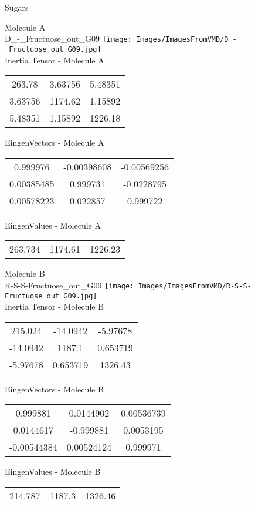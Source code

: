 \vtab[-2cm]
\begin{center}
{\large Sugars}
\end{center}
\begin{multicols}{2}
\begin{center}
Molecule A \\ 
D\_-\_Fructuose\_out\_G09
\texttt{[image: Images/ImagesFromVMD/D\_-\_Fructuose\_out\_G09.jpg]}
\\
Inertia Tensor - Molecule A \\
\vtab
\begin{tabular}{|c c c|}
263.78	 & 	3.63756	 & 	5.48351	 \\
3.63756	 & 	1174.62	 & 	1.15892	 \\
5.48351	 & 	1.15892	 & 	1226.18
\end{tabular}

\vtab
 EingenVectors - Molecule A     \\
\vtab
\begin{tabular}{|c c c|}
0.999976	 & 	-0.00398608	 & 	-0.00569256	 \\
0.00385485	 & 	0.999731	 & 	-0.0228795	 \\
0.00578223	 & 	0.022857	 & 	0.999722
\end{tabular}

\vtab
 EingenValues - Molecule A     \\
\vtab
\begin{tabular}{|c c c|}
263.734	 & 	1174.61	 & 	1226.23
\end{tabular}
\columnbreak

Molecule B \\ 
R-S-S-Fructuose\_out\_G09
\texttt{[image: Images/ImagesFromVMD/R-S-S-Fructuose\_out\_G09.jpg]}
\\
Inertia Tensor - Molecule B \\
\vtab
\begin{tabular}{|c c c|}
215.024	 & 	-14.0942	 & 	-5.97678	 \\
-14.0942	 & 	1187.1	 & 	0.653719	 \\
-5.97678	 & 	0.653719	 & 	1326.43
\end{tabular}

\vtab
 EingenVectors - Molecule B     \\
\vtab
\begin{tabular}{|c c c|}
0.999881	 & 	0.0144902	 & 	0.00536739	 \\
0.0144617	 & 	-0.999881	 & 	0.0053195	 \\
-0.00544384	 & 	0.00524124	 & 	0.999971
\end{tabular}

\vtab
 EingenValues - Molecule B     \\
\vtab
\begin{tabular}{|c c c|}
214.787	 & 	1187.3	 & 	1326.46
\end{tabular}

\end{center}
\end{multicols}
